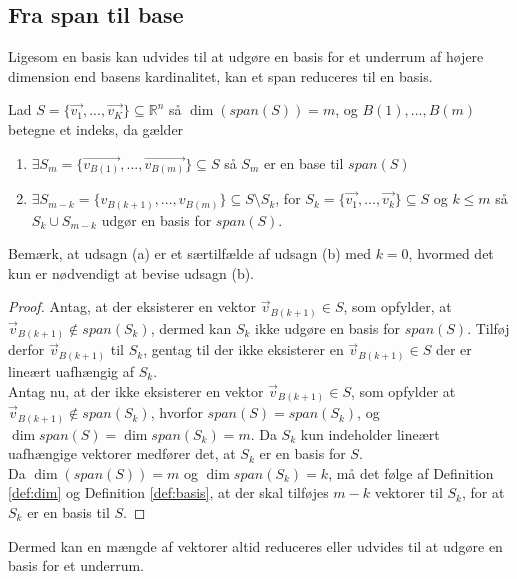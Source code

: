 \subsection{Fra span til base}
Ligesom en basis kan udvides til at udgøre en basis for et underrum af højere dimension end basens kardinalitet, kan et span reduceres til en basis.
\begin{stn}
Lad $S=\{\vec{v_1},..., \vec{v_K}\} \subseteq \mathds{R}^n$ så $\dim(span(S)) = m$, og $B(1),...,B(m)$ betegne et indeks, da gælder
\begin{enumerate}[label=\alph*]
\item $\exists S_m =\{\vec{v_{B(1)}},...,\vec{v_{B(m)}}\}\subseteq S$ så $S_m$ er en base til $span (S)$
\item $\exists S_{m-k} = \{v_{B(k+1)},...,v_{B(m)}\} \subseteq S\setminus S_k$, for $S_k = \{\vec{v_1},..., \vec{v_k}\} \subseteq S$ og $k \leq m$ så $S_k \cup S_{m-k}$ udgør en basis for $span(S)$.
\end{enumerate} 
\label{stn:spantilbasis}
\end{stn}
Bemærk, at udsagn (a) er et særtilfælde af udsagn (b) med $k=0$, hvormed det kun er nødvendigt at bevise udsagn (b).
\begin{proof}
Antag, at der eksisterer en vektor $\vec{v}_{B(k+1)} \in S$, som opfylder, at $\vec{v}_{B(k+1)} \notin span(S_k)$, dermed kan $S_k$ ikke udgøre en basis for $span(S)$. 
Tilføj derfor $\vec{v}_{B(k+1)}$ til $S_k$, gentag til der ikke eksisterer en $\vec{v}_{B(k+1)} \in S$ der er lineært uafhængig af $S_k$. 
\\Antag nu, at der ikke eksisterer en vektor $\vec{v}_{B(k+1)} \in S$, som opfylder at $\vec{v}_{B(k+1)} \notin span(S_k)$, hvorfor $span(S) = span(S_k)$, og $\dim{span(S)}=\dim{span(S_k)}= m$.
Da $S_k$ kun indeholder lineært uafhængige vektorer medfører det, at $S_k$ er en basis for $S$.
\\Da $\dim(span(S)) = m$ og $\dim{span(S_k)}=k$, må det følge af Definition \ref{def:dim} og Definition \ref{def:basis}, at der skal tilføjes $m-k$ vektorer til $S_k$, for at $S_k$ er en basis til $S$.
\end{proof} 
Dermed kan en mængde af vektorer altid reduceres eller udvides til at udgøre en basis for et underrum.


